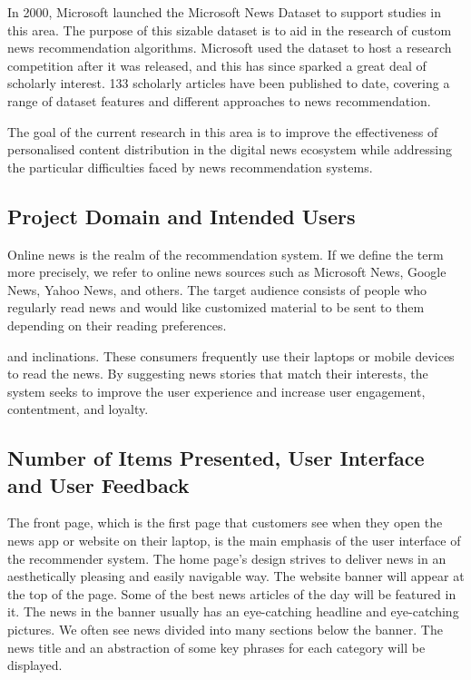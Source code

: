 \documentclass[9pt,twocolumn,twoside,lineno]{gsajnl}
\begin{document}
In 2000, Microsoft launched the Microsoft News Dataset \cite{webteam@eso.org} to support studies in this area. The purpose of this sizable dataset is to aid in the research of custom news recommendation algorithms. Microsoft used the dataset to host a research competition after it was released, and this has since sparked a great deal of scholarly interest. 133 scholarly articles have been published to date, covering a range of dataset features and different approaches to news recommendation.

The goal of the current research in this area is to improve the effectiveness of personalised content distribution in the digital news ecosystem while addressing the particular difficulties faced by news recommendation systems.

\subsection{Project Domain and Intended Users}
Online news is the realm of the recommendation system. If we define the term more precisely, we refer to online news sources such as Microsoft News, Google News, Yahoo News, and others. The target audience consists of people who regularly read news and would like customized material to be sent to them depending on their reading preferences.
 
and inclinations. These consumers frequently use their laptops or mobile devices to read the news. By suggesting news stories that match their interests, the system seeks to improve the user experience and increase user engagement, contentment, and loyalty.

\subsection{Number of Items Presented, User Interface and User Feedback}
The front page, which is the first page that customers see when they open the news app or website on their laptop, is the main emphasis of the user interface of the recommender system. The home page's design strives to deliver news in an aesthetically pleasing and easily navigable way. The website banner will appear at the top of the page. Some of the best news articles of the day will be featured in it. The news in the banner usually has an eye-catching headline and eye-catching pictures. We often see news divided into many sections below the banner. The news title and an abstraction of some key phrases for each category will be displayed.
\end{document}
